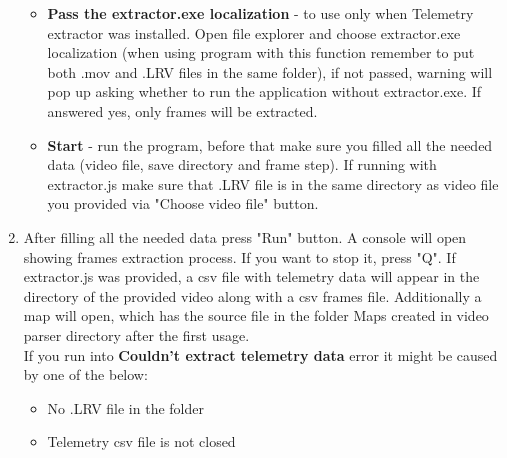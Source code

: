 \documentclass[a4paper,12pt]{book}
\begin{document}
\begin{enumerate}
\begin{itemize}
		\item \textbf{Pass the extractor.exe localization} - to use only when Telemetry extractor was installed. Open file explorer and choose extractor.exe localization (when using program with this function remember to put both .mov and .LRV files in the same folder), if not passed,  warning will pop up asking whether to run the application without extractor.exe. If answered yes, only frames will be extracted.
		\item \textbf{Start} - run the program, before that make sure you filled all the needed data (video file, save directory and frame step). If running with extractor.js make sure that .LRV file is in the same directory as video file you provided via "Choose video file" button.
	\end{itemize}
	\item \begin{minipage}[t]{\linewidth}
		\raggedright
		\medskip	
	\end{minipage}
	After filling all the needed data press "Run" button. A console will open showing frames extraction process. If you want to stop it, press "Q". If extractor.js was provided, a csv file with telemetry data will appear in the directory of the provided video along with a csv frames file. Additionally a map will open, which has the source file in the folder Maps created in video parser directory after the first usage.\\
	If you run into \textbf{Couldn't extract telemetry data} error it might be caused by one of the below:
	\begin{itemize}
		\item No .LRV file in the folder
		\item Telemetry csv file is not closed
	\end{itemize}
\end{enumerate}
\end{document}
